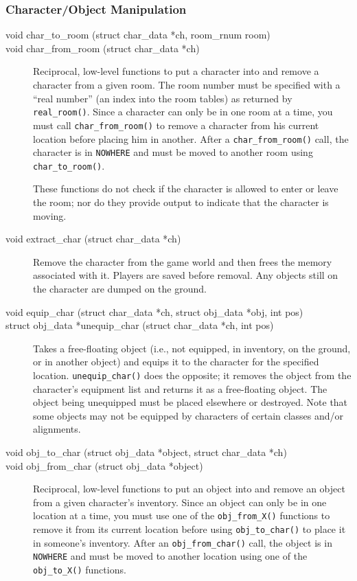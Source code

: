 \documentclass[11pt]{article}
\begin{document}
\subsubsection{Character/Object Manipulation}
\begin{description}
\item[void char\_to\_room (struct char\_data *ch, room\_rnum room)]
\item[void char\_from\_room (struct char\_data *ch)]
Reciprocal, low-level functions to put a character into and remove a character from a given room.  The room number must be specified with a ``real number'' (an index into the room tables) as returned by \texttt{real\_room()}.  Since a character can only be in one room at a time, you must call \texttt{char\_from\_room()} to remove a character from his current location before placing him in another.  After a \texttt{char\_from\_room()} call, the character is in \texttt{NOWHERE} and must be moved to another room using \texttt{char\_to\_room()}.
\par
These functions do not check if the character is allowed to enter or leave the room; nor do they provide output to indicate that the character is moving.
\item[void extract\_char (struct char\_data *ch)]
Remove the character from the game world and then frees the memory associated with it.  Players are saved before removal.  Any objects still on the character are dumped on the ground.
\item[void equip\_char (struct char\_data *ch, struct obj\_data *obj, int pos)]
\item[struct obj\_data *unequip\_char (struct char\_data *ch, int pos)]
Takes a free-floating object (i.e., not equipped, in inventory, on the ground, or in another object) and equips it to the character for the specified location. \texttt{unequip\_char()} does the opposite; it removes the object from the character's equipment list and returns it as a free-floating object.  The object being unequipped must be placed elsewhere or destroyed.  Note that some objects may not be equipped by characters of certain classes and/or alignments.
\item[void obj\_to\_char (struct obj\_data *object, struct char\_data *ch)]
\item[void obj\_from\_char (struct obj\_data *object)]
Reciprocal, low-level functions to put an object into and remove an object from a given character's inventory.  Since an object can only be in one location at a time, you must use one of the \texttt{obj\_from\_X()} functions to remove it from its current location before using \texttt{obj\_to\_char()} to place it in someone's inventory.  After an \texttt{obj\_from\_char()} call, the object is in \texttt{NOWHERE} and must be moved to another location using one of the \texttt{obj\_to\_X()} functions.

\end{description}
\end{document}
